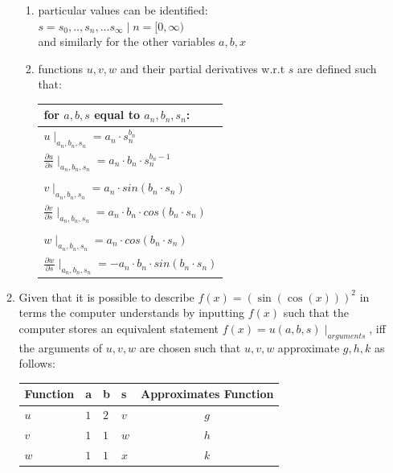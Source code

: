 \documentclass[preprint,12pt]{elsarticle}
\begin{document}
\begin{enumerate}
\begin{enumerate}
\begin{enumerate}
\item
particular values can be identified: \\
$s = s_0,..,s_n,...s_{\infty} \mid n=[0,\infty)$ \\ 
and similarly for the other variables $a,b,x$ \\
\item
functions $u,v,w$ and their partial derivatives w.r.t $s$ are defined such that: \\
\begin{tabular}{l}
for $a, b, s$ equal to $a_n, b_n, s_n$: \\ \hline
$u \mid _{a_n, b_n, s_n} = a_n \cdot s_n^{b_n}$ \\
$\frac{\partial{u}}{\partial{s}} \mid _{a_n, b_n, s_n} = a_n \cdot b_n \cdot s_n^{b_n - 1}$ \\
\\
$v \mid _{a_n, b_n, s_n} = a_n \cdot sin(b_n \cdot s_n)$ \\
$\frac{\partial{v}}{\partial{s}} \mid _{a_n, b_n, s_n} = a_n \cdot b_n \cdot cos(b_n \cdot s_n)$ \\ 
\\
$w \mid _{a_n, b_n, s_n} = a_n \cdot cos(b_n \cdot s_n)$ \\
$\frac{\partial{w}}{\partial{s}} \mid _{a_n, b_n, s_n} = -a_n \cdot b_n \cdot sin(b_n \cdot s_n)$\\
\end{tabular} 
\end{enumerate}
\item 
\label{abcvalues}
Given that it is possible to describe $f(x) = (\sin(\cos(x)))^2$ in terms the computer understands by inputting
$f(x)$ such that the computer stores an equivalent statement $f(x) = u(a, b, s) \mid_{arguments}$,
iff the arguments of $u,v,w$ are chosen such that $u,v,w$ approximate $g,h,k$ as follows:\\
\begin{tabular}{l l l l | c}
	Function & a & b & s & Approximates Function\\ \hline 
	$u$ & $1$ & $2$ & $v$ & $g$\\ \hline 
	$v$ & $1$ & $1$ & $w$ & $h$\\ \hline 
	$w$ & $1$ & $1$ & $x$ & $k$\\ \hline 	
\end{tabular}
\end{enumerate} 


\end{enumerate}
\end{document}
